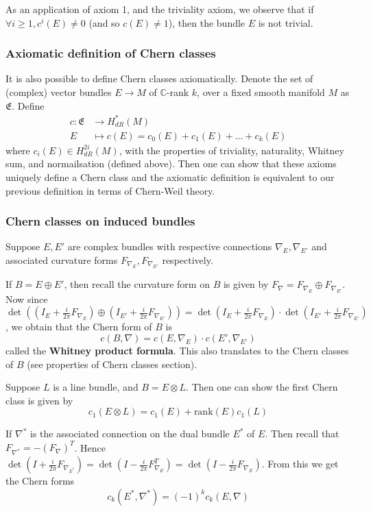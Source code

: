 \documentclass[a4paper]{article}
\theoremstyle{definition} \newtheorem*{definition}{Definition}
\theoremstyle{definition} \newtheorem*{definitions}{Definitions}
\theoremstyle{plain} \newtheorem{theorem}{Theorem}[section]
\theoremstyle{plain} \newtheorem{proposition}[theorem]{Proposition}
\theoremstyle{plain} \newtheorem{corollary}[theorem]{Corollary}
\theoremstyle{plain} \newtheorem{lemma}[theorem]{Lemma}
\theoremstyle{plain} \newtheorem{example}[theorem]{Example}
\newcommand{\defn}[1]{\textbf{#1}}
\newcommand{\complexnos}{\mathbb{C}}
\begin{document}
As an application of axiom 1, and the triviality axiom, we observe that if $\forall i\geq 1, c^i(E)\neq 0$ (and so $c(E)\neq 1$), then the bundle $E$ is not trivial. 

\subsubsection{Axiomatic definition of Chern classes}
It is also possible to define Chern classes axiomatically. Denote the set of (complex) vector bundles $E\to M$ of $\complexnos$-rank $k$, over a fixed smooth manifold $M$ as $\mathfrak{E}$. Define
\begin{align*}
    c: \mathfrak{E} & \to H^*_{dR}(M) \\
    E & \mapsto c(E) = c_0(E)+c_1(E)+\ldots +c_k(E)
\end{align*}
where $c_i(E)\in H^{2i}_{dR}(M)$, with the properties of triviality, naturality, Whitney sum, and normailsation (defined above). Then one can show that these axioms uniquely define a Chern class and the axiomatic definition is equivalent to our previous definition in terms of Chern-Weil theory. 

\subsubsection{Chern classes on induced bundles}
Suppose $E, E'$ are complex bundles with respective connections $\nabla_E, \nabla_{E'}$ and associated curvature forms $F_{\nabla_E}, F_{\nabla_{E'}}$ respectively.

If $B=E \oplus E'$, then recall the curvature form on $B$ is given by $F_\nabla = F_{\nabla_E} \oplus F_{\nabla_{E'}}$. 
Now since $\det((I_E + \frac{i}{2\pi}F_{\nabla_E})\oplus (I_{E'} + \frac{i}{2\pi}F_{\nabla_{E'}})) = \det(I_E + \frac{i}{2\pi}F_{\nabla_E})\cdot  \det(I_{E'} + \frac{i}{2\pi}F_{\nabla_{E'}})$, we obtain that the Chern form of $B$ is
$$c(B, \nabla) = c(E, \nabla_E)\cdot c(E', \nabla_{E'})$$
called the \defn{Whitney product formula}. This also translates to the Chern classes of $B$ (see properties of Chern classes section). 

Suppose $L$ is a line bundle, and $B = E\otimes L$. Then one can show the first Chern class is given by $$c_1(E\otimes L) = c_1(E) + \text{rank}(E)c_1(L)$$

If $\nabla^*$ is the associated connection on the dual bundle $E^*$ of $E$. Then recall that $F_{\nabla^*} = -(F_\nabla)^T$. Hence $\det(I + \frac{i}{2\pi}F_{\nabla_{E^*}}) = \det(I - \frac{i}{2\pi}F_{\nabla_E}^T)=\det(I - \frac{i}{2\pi}F_{\nabla_E})$. From this we get the Chern forms 
$$c_k(E^*, \nabla^*)=(-1)^k c_k(E, \nabla)$$
\end{document}
